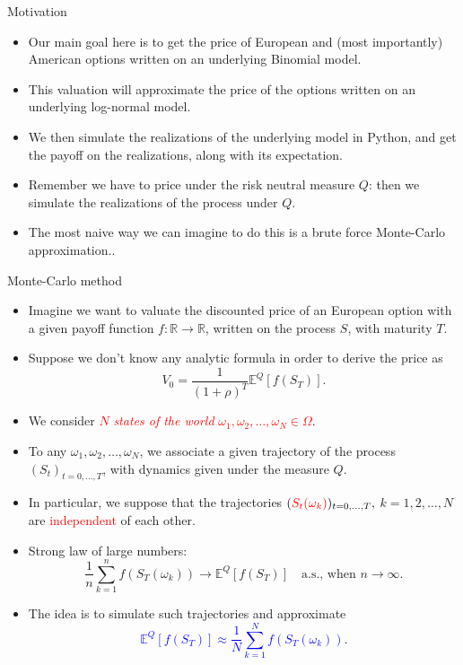 \documentclass[9 pt]{beamer} %
\def \blue {\textcolor{blue}}
\def \red {\textcolor{red}}
\def \bE {\mathbb{E}}
\begin{document}
\begin{frame}{Motivation}
\begin{itemize}
\item Our main goal here is to get the price of European and (most importantly) American options written on an underlying Binomial model. 
\item This valuation will approximate the price of the options written on an underlying log-normal model.
\item We then simulate the realizations of the underlying model in Python, and get the payoff on the realizations, along with its expectation.
\item Remember we have to price under the risk neutral measure $Q$: then we simulate the realizations of the process under $Q$.
\item The most naive way we can imagine to do this is a brute force Monte-Carlo approximation..
\end{itemize}
\end{frame}


\begin{frame}{Monte-Carlo method}
\begin{itemize}
\item Imagine we want to valuate the discounted price of an European option with a given payoff function $f:\mathbb{R} \to \mathbb{R}$, written on the process $S$, with maturity $T$.
\item Suppose  we don't know any analytic formula in order to derive the price as  $$V_0=\frac{1}{(1+\rho)^T}\bE^Q[f(S_T)].$$
\item We consider \red{$N$ \emph{states of the world} $\omega_1, \omega_2, \dots, \omega_N \in \Omega$}.
\item To any $\omega_1, \omega_2, \dots, \omega_N$, we associate a given trajectory of the process $(S_t)_{t = 0, \dots,T}$, with dynamics given under the measure $Q$. 
\item In particular, we suppose that the trajectories
$(\red{S_t(\omega_k)})_{t = 0, \dots,T},$ $k=1,2,\dots,N$ are \red{independent} of each other.
\item Strong law of large numbers:
$$
 \frac{1}{n}\sum_{k=1}^n f(S_T(\omega_k)) \to \bE^Q[f(S_T)] \quad \text {a.s., when $n \to \infty$}.
$$
\item The idea is to simulate such trajectories and approximate
\blue{$$
\bE^Q[f(S_T)] \approx \frac{1}{N}\sum_{k=1}^N f(S_T(\omega_k)).
$$}
\end{itemize}
\end{frame}
\end{document}
